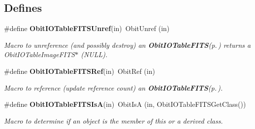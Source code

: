\subsection*{Defines}
\begin{CompactItemize}
\item 
\#define {\bf Obit\-IOTable\-FITSUnref}(in)\ Obit\-Unref (in)
\begin{CompactList}\small\item\em Macro to unreference (and possibly destroy) an {\bf Obit\-IOTable\-FITS}{\rm (p.\,\pageref{structObitIOTableFITS})} returns a Obit\-IOTable\-Image\-FITS$\ast$ (NULL). \item\end{CompactList}\item 
\#define {\bf Obit\-IOTable\-FITSRef}(in)\ Obit\-Ref (in)
\begin{CompactList}\small\item\em Macro to reference (update reference count) an {\bf Obit\-IOTable\-FITS}{\rm (p.\,\pageref{structObitIOTableFITS})}. \item\end{CompactList}\item 
\#define {\bf Obit\-IOTable\-FITSIs\-A}(in)\ Obit\-Is\-A (in, Obit\-IOTable\-FITSGet\-Class())
\begin{CompactList}\small\item\em Macro to determine if an object is the member of this or a derived class. \item\end{CompactList}\end{CompactItemize}
